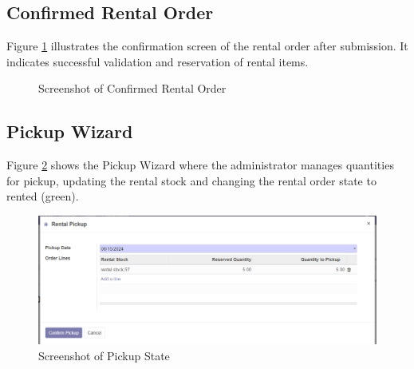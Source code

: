 \subsection{Confirmed Rental Order}
Figure \ref{fig:confirmed_rental_order} illustrates the confirmation screen of the rental order after submission. It indicates successful validation and reservation of rental items.

\begin{figure}[h]
    \centering
    \caption{Screenshot of Confirmed Rental Order}
    \label{fig:confirmed_rental_order}
\end{figure}

\subsection{Pickup Wizard}
Figure \ref{fig:pickup_state} shows the Pickup Wizard where the administrator manages quantities for pickup, updating the rental stock and changing the rental order state to rented (green).

\begin{figure}[h]
    \centering
    \includegraphics[width=1\textwidth]{sprint2/rentalorderpickup3.png}
    \caption{Screenshot of Pickup State}
    \label{fig:pickup_state}
\end{figure}

